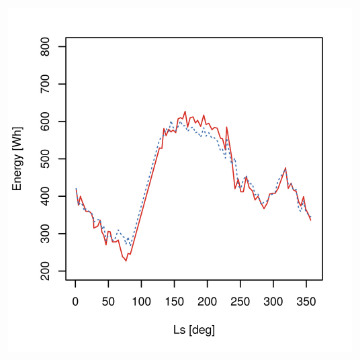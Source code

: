 \begin{figure}[h]
\begin{subfigure}[t]{\subfigureWidth}
		\label{fig:plot:sub:mer-energy-production-predicted-vs-reported-my32-adjusted}
	\end{subfigure}\\[0.8ex]
    \begin{subfigure}[t]{\subfigureWidth}
        \centering
		\includegraphics[height=\graphicsHeight]{sections/appendix/energy-error-margin/plots/predicted-vs-measured-energy-my29-adjusted-without-outliers.png}
		\label{fig:plot:sub:mer-energy-production-predicted-vs-reported-my29-adjusted-without-outliers}
	\end{subfigure}\hfill
	\begin{subfigure}[t]{\subfigureWidth}
        \centering

\end{subfigure}
\end{figure}
